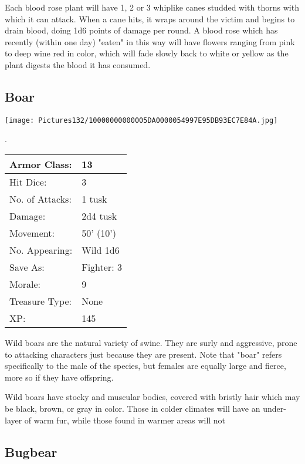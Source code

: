 \documentclass[a4paper,twoside,openany,10pt]{book}
\begin{document}
\begin{multicols}{2}
Each blood rose plant will have 1, 2 or 3 whiplike canes studded with thorns with which it can attack. When a cane hits, it wraps around the victim and begins to drain blood, doing 1d6 points of damage per round. A blood rose which has recently (within one day) "eaten" in this way will have flowers ranging from pink to deep wine red in color, which will fade slowly back to white or yellow as the plant digests the blood it has consumed.

\subsection*{Boar}\label{boar}


\begin{center}
	\texttt{[image: Pictures132/10000000000005DA0000054997E95DB93EC7E84A.jpg]}
\end{center}.

\begin{center}
	\begin{tabularx}{0.48\textwidth}{@{}lX@{}}
Armor Class: & 13 \\\hline
Hit Dice: & 3 \\\hline
No. of Attacks: & 1 tusk \\\hline
Damage: & 2d4 tusk \\\hline
Movement: & 50' (10') \\\hline
No. Appearing: & Wild 1d6 \\\hline
Save As: & Fighter: 3 \\\hline
Morale: & 9 \\\hline
Treasure Type: & None \\\hline
XP: & 145 \\\hline
\end{tabularx}\medskip

\end{center}
Wild
boars are the natural variety of swine. They are surly and aggressive, prone to attacking characters just because they are present. Note that "boar" refers specifically to the male of the species, but females are equally large and fierce, more so if they have offspring. 

Wild boars have stocky and muscular bodies, covered with bristly hair which may be black, brown, or gray in color. Those in colder climates will have an under-layer of warm fur, while those found in warmer areas will not

\subsection*{Bugbear}\label{bugbear}


\end{multicols}
\end{document}
